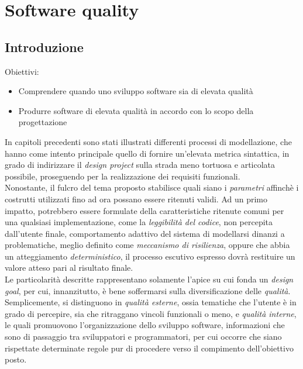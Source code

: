 \documentclass{article}
\begin{document}
\pagestyle{empty}
\section*{Software quality}
\large

\subsection*{Introduzione}
\large
Obiettivi:
\begin{itemize}
    \renewcommand{\labelitemi}{-}
    \itemsep0em
    \item Comprendere quando uno sviluppo software sia di elevata qualità
    \item Produrre software di elevata qualità in accordo con lo scopo della progettazione 
\end{itemize}
In capitoli precedenti sono stati illustrati differenti processi di modellazione, che hanno come intento principale quello di fornire un'elevata metrica sintattica, in grado di indirizzare il \textit{design project} sulla strada meno tortuosa e articolata possibile, proseguendo per la realizzazione dei requisiti funzionali.\vspace*{14pt}\\
Nonostante, il fulcro del tema proposto stabilisce quali siano i \textit{parametri} affinchè i costrutti utilizzati fino ad ora possano essere ritenuti validi. Ad un primo impatto, potrebbero essere formulate della caratteristiche ritenute comuni per una qualsiasi implementazione, come la \textit{leggibilità del codice}, non percepita dall'utente finale, comportamento adattivo del sistema di modellarsi dinanzi a problematiche, meglio definito come \textit{meccanismo di risilienza}, oppure che abbia un atteggiamento \textit{deterministico}, il processo escutivo espresso dovrà restituire un valore atteso pari al risultato finale.\vspace*{14pt}\\
Le particolarità descritte rappresentano solamente l'apice su cui fonda un \textit{design goal}, per cui, innanzitutto, è bene soffermarsi sulla diversificazione delle \textit{qualità}.\vspace*{14pt}\\
Semplicemente, si distinguono in \textit{qualità esterne}, ossia tematiche che l'utente è in grado di percepire, sia che ritraggano vincoli funzionali o meno, e \textit{qualità interne}, le quali promuovono l'organizzazione dello sviluppo software, informazioni che sono di passaggio tra sviluppatori e programmatori, per cui occorre che siano rispettate determinate regole pur di procedere verso il compimento dell'obiettivo posto.\vspace*{14pt}\\
\end{document}
